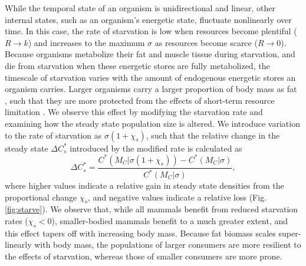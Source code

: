 \documentclass[]{rsos}%
\begin{document}

While the temporal state of an organism is unidirectional and linear, other internal states, such as an organism's energetic state, fluctuate nonlinearly over time.
In this case, the rate of starvation is low when resources become plentiful ($R \rightarrow k$) and increases to the maximum $\sigma$ as resources become scarce ($R \rightarrow 0$).
Because organisms metabolize their fat and muscle tissue during starvation, and die from starvation when these energetic stores are fully metabolized, the timescale of starvation varies with the amount of endogenous energetic stores an organism carries.
Larger organisms carry a larger proportion of body mass as fat \cite{Lindstedt:2002td}, such that they are more protected from the effects of short-term resource limitation \cite{Millar:1990p923}.
We observe this effect by modifying the starvation rate and examining how the steady state population size is altered.
We introduce variation to the rate of starvation as $\sigma(1+\chi_s)$,
such that the relative change in the steady state $\Delta C^*_s$ introduced by the modified rate is calculated as 
\begin{equation}
\Delta C^*_s = \frac{C^*(M_C|\sigma(1+\chi_s)) - C^*(M_C|\sigma)}{C^*(M_C|\sigma)},
\label{eq:starve}
\end{equation}
where higher values indicate a relative gain in steady state densities from the proportional change $\chi_s$, and negative values indicate a relative loss (Fig. \ref{fig:starve}).
We observe that, while all mammals benefit from reduced starvation rates ($\chi_s<0$), smaller-bodied mammals benefit to a much greater extent, and this effect tapers off with increasing body mass.
Because fat biomass scales super-linearly with body mass, the populations of larger consumers are more resilient to the effects of starvation, whereas those of smaller consumers are more prone.
\end{document}
